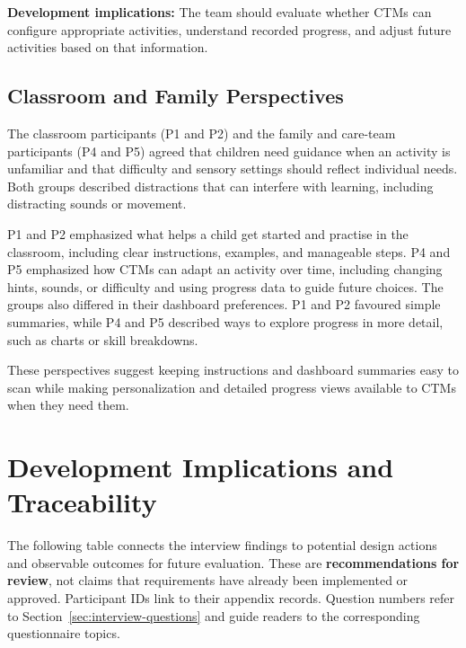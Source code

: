 \documentclass[12pt, titlepage]{article}
\begin{document}
\noindent\textbf{Development implications:} The team should evaluate whether CTMs can configure appropriate activities, understand recorded progress, and adjust future activities based on that information.

\subsection{Classroom and Family Perspectives}

The classroom participants (P1 and P2) and the family and care-team
participants (P4 and P5) agreed that children need guidance when an activity
is unfamiliar and that difficulty and sensory settings should reflect
individual needs. Both groups described distractions that can interfere with
learning, including distracting sounds or movement.

P1 and P2 emphasized what helps a child get started and practise in the
classroom, including clear instructions, examples, and manageable steps.
P4 and P5 emphasized how CTMs can adapt an activity over time, including
changing hints, sounds, or difficulty and using progress data to guide
future choices. The groups also differed in their dashboard preferences.
P1 and P2 favoured simple summaries, while P4 and P5 described ways to
explore progress in more detail, such as charts or skill breakdowns.

These perspectives suggest keeping instructions and dashboard summaries
easy to scan while making personalization and detailed progress views
available to CTMs when they need them.

\section{Development Implications and Traceability}
\label{sec:development-traceability}

The following table connects the interview findings to potential design actions and observable outcomes for future evaluation. These are \textbf{recommendations for review}, not claims that requirements have already been implemented or approved. Participant IDs link to their appendix records. Question numbers refer to Section~\ref{sec:interview-questions} and guide readers to the corresponding questionnaire topics.
\end{document}
